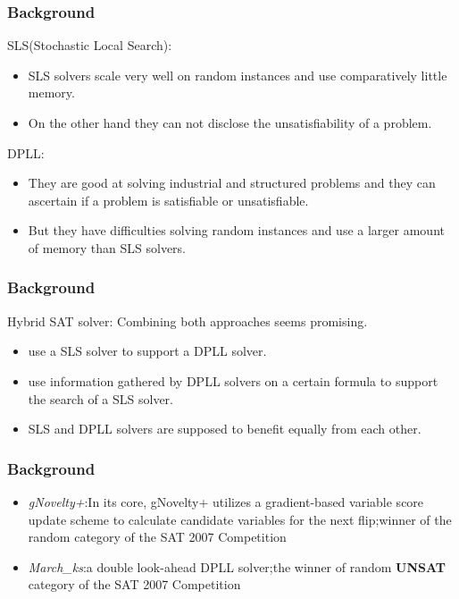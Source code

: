 \documentclass[aspectratio=169%
,serif,mathserif]{beamer}
\begin{document}
\begin{frame}
	\frametitle{Background}
	SLS(Stochastic Local Search):
	\begin{itemize}
		\item SLS solvers scale very well on random instances and use comparatively little memory.
		\item On the other hand they can not disclose the unsatisfiability of a problem.	
	\end{itemize}

	DPLL:
	\begin{itemize}
		\item They are good at solving industrial and structured problems and they can ascertain if a problem is satisfiable or unsatisfiable.
		\item But they have difficulties solving random instances and use a larger amount of memory than SLS solvers.
	\end{itemize}
	
\end{frame}

\begin{frame}
	\frametitle{Background}
	Hybrid SAT solver: Combining both approaches seems promising.
	\begin{itemize}
		\item use a SLS solver to support a DPLL solver.
		\item use information gathered by DPLL solvers on a certain formula to support the search of a SLS solver.
		\item SLS and DPLL solvers are supposed to benefit equally from each other.
	\end{itemize}	

\end{frame}

\begin{frame}
	\frametitle{Background}
	\begin{itemize}
		\item \emph{gNovelty+}:In its core, gNovelty+ utilizes a gradient-based variable score update scheme to calculate candidate variables for the next flip;winner of the random category of the SAT 2007 Competition
		\item \emph{March\_ks}:a double look-ahead DPLL solver;the winner of random \textbf{UNSAT} category of the SAT 2007 Competition
	\end{itemize}
\end{frame}
\end{document}
